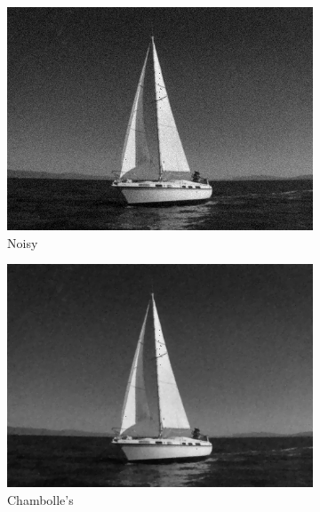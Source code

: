 \documentclass[11pt]{article}
\begin{document}
\begin{figure}
\centering
\graphicspath{{images/}}
\begin{subfigure}[b]{0.4\textwidth}
\centering
\includegraphics[width=\textwidth]{sailboat_10}
\caption{Noisy}
\label{sail:noise}
\end{subfigure}
\begin{subfigure}[b]{0.4\textwidth}
\centering
\includegraphics[width=\textwidth]{sailboat_10_ch}
\caption{Chambolle's}
\label{sail:ch}
\end{subfigure}
\begin{subfigure}[b]{0.4\textwidth}
\centering

\end{subfigure}
\end{figure}
\end{document}

